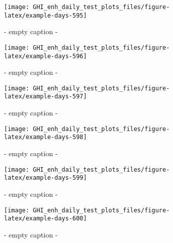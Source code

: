 \documentclass[
  10pt,
  a4paper,oneside]{article}
\begin{document}
\begin{figure}[H]

{\centering \texttt{[image: GHI\_enh\_daily\_test\_plots\_files/figure-latex/example-days-595]} 

}

\caption{ - empty caption - }\label{fig:example-days-595}
\end{figure}

\begin{figure}[H]

{\centering \texttt{[image: GHI\_enh\_daily\_test\_plots\_files/figure-latex/example-days-596]} 

}

\caption{ - empty caption - }\label{fig:example-days-596}
\end{figure}

\begin{figure}[H]

{\centering \texttt{[image: GHI\_enh\_daily\_test\_plots\_files/figure-latex/example-days-597]} 

}

\caption{ - empty caption - }\label{fig:example-days-597}
\end{figure}

\begin{figure}[H]

{\centering \texttt{[image: GHI\_enh\_daily\_test\_plots\_files/figure-latex/example-days-598]} 

}

\caption{ - empty caption - }\label{fig:example-days-598}
\end{figure}

\begin{figure}[H]

{\centering \texttt{[image: GHI\_enh\_daily\_test\_plots\_files/figure-latex/example-days-599]} 

}

\caption{ - empty caption - }\label{fig:example-days-599}
\end{figure}

\begin{figure}[H]

{\centering \texttt{[image: GHI\_enh\_daily\_test\_plots\_files/figure-latex/example-days-600]} 

}

\caption{ - empty caption - }\label{fig:example-days-600}
\end{figure}
\end{document}
